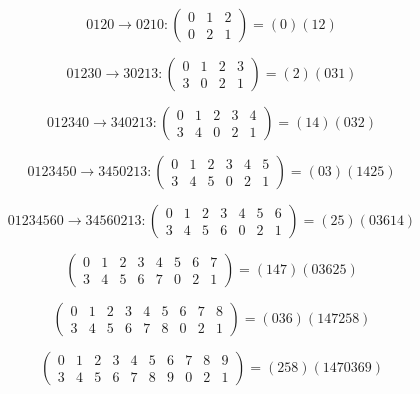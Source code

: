 \documentclass[a4paper,10pt]{article}
\begin{document}
\begin{equation}
0120\rightarrow0210:
\begin{pmatrix}
0&1&2\\
0&2&1
\end{pmatrix} = (0)(12)
\end{equation}

\begin{equation}
01230\rightarrow30213:
\begin{pmatrix}
0&1&2&3\\
3&0&2&1
\end{pmatrix} = (2)(031)
\end{equation}

\begin{equation}
012340\rightarrow340213:
\begin{pmatrix}
0&1&2&3&4\\
3&4&0&2&1
\end{pmatrix} = (14)(032)
\end{equation}

\begin{equation}
0123450\rightarrow3450213:
\begin{pmatrix}
0&1&2&3&4&5\\
3&4&5&0&2&1
\end{pmatrix} = (03)(1425)
\end{equation}

\begin{equation}
01234560\rightarrow34560213:
\begin{pmatrix}
0&1&2&3&4&5&6\\
3&4&5&6&0&2&1
\end{pmatrix} = (25)(03614)
\end{equation}

\begin{equation}
\begin{pmatrix}
0&1&2&3&4&5&6&7\\
3&4&5&6&7&0&2&1
\end{pmatrix} = (147)(03625)
\end{equation}

\begin{equation}
\begin{pmatrix}
0&1&2&3&4&5&6&7&8\\
3&4&5&6&7&8&0&2&1
\end{pmatrix} = (036)(147258)
\end{equation}

\begin{equation}
\begin{pmatrix}
0&1&2&3&4&5&6&7&8&9\\
3&4&5&6&7&8&9&0&2&1
\end{pmatrix} = (258)(1470369)
\end{equation}
\end{document}
